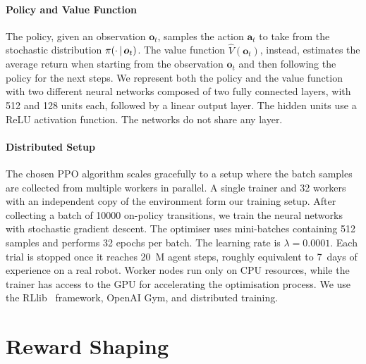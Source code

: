 \paragraph{Policy and Value Function}

The policy, given an observation $\boldsymbol{o}_t$, samples the action $\boldsymbol{a}_t$ to take from the stochastic distribution $\pi(\cdot \operatorname{\mid} \boldsymbol{o}_t)$.
The value function $\hat{V}(\boldsymbol{o}_t)$, instead, estimates the average return when starting from the observation $\boldsymbol{o}_t$ and then following the policy for the next steps.
We represent both the policy and the value function with two different neural networks composed of two fully connected layers, with 512 and 128 units each, followed by a linear output layer.
The hidden units use a ReLU activation function.
The networks do not share any layer.

\paragraph{Distributed Setup}

The chosen \ac{PPO} algorithm scales gracefully to a setup where the batch samples are collected from multiple workers in parallel.
A single trainer and 32 workers with an independent copy of the environment form our training setup.
After collecting a batch of 10000 on-policy transitions, we train the neural networks with stochastic gradient descent.
The optimiser uses mini-batches containing 512 samples and performs 32 epochs per batch.
The learning rate is $\lambda = 0.0001$.
Each trial is stopped once it reaches 20~M agent steps, roughly equivalent to 7~days of experience on a real robot.
Worker nodes run only on \ac{CPU} resources, while the trainer has access to the \ac{GPU} for accelerating the optimisation process.
We use the RLlib~\parencite{liang_rllib_2018} framework, OpenAI Gym, and distributed training.

\section{Reward Shaping}
\label{sec:reward_shaping}

